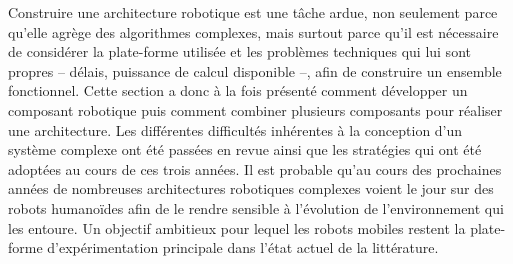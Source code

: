 Construire une architecture robotique est une tâche ardue, non
seulement parce qu'elle agrège des algorithmes complexes, mais surtout
parce qu'il est nécessaire de considérer la plate-forme utilisée et
les problèmes techniques qui lui sont propres -- délais, puissance de
calcul disponible --, afin de construire un ensemble
fonctionnel. Cette section a donc à la fois présenté comment
développer un composant robotique puis comment combiner plusieurs
composants pour réaliser une architecture. Les différentes difficultés
inhérentes à la conception d'un système complexe ont été passées en
revue ainsi que les stratégies qui ont été adoptées au cours de ces
trois années. Il est probable qu'au cours des prochaines années de
nombreuses architectures robotiques complexes voient le jour sur des
robots humanoïdes afin de le rendre sensible à l'évolution de
l'environnement qui les entoure. Un objectif ambitieux pour lequel les
robots mobiles restent la plate-forme d'expérimentation principale
dans l'état actuel de la littérature.


